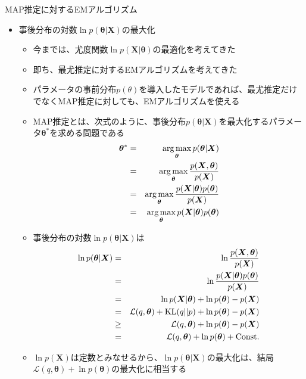 \documentclass[dvipdfmx,notheorems,t]{beamer}
\begin{document}
\begin{frame}{MAP推定に対するEMアルゴリズム}

\begin{itemize}
	\item 事後分布の対数$\ln p(\bm{\theta} | \bm{X})$の最大化
	\begin{itemize}
		\item 今までは、尤度関数$\ln p(\bm{X} | \bm{\theta})$の最適化を考えてきた
		\item 即ち、\alert{最尤推定に対するEMアルゴリズム}を考えてきた
		\newline
		\item パラメータの事前分布$p(\theta)$を導入したモデルであれば、最尤推定だけでなく\alert{MAP推定}に対しても、EMアルゴリズムを使える
		\newline
		\item MAP推定とは、次式のように、事後分布$p(\bm{\theta} | \bm{X})$を最大化するパラメータ$\bm{\theta}^*$を求める問題である
		\begin{eqnarray}
			\bm{\theta}^* &=& \operatorname*{arg\,max}_{\bm{\theta}} p(\bm{\theta} | \bm{X}) \\
			&=& \operatorname*{arg\,max}_{\bm{\theta}} \frac{p(\bm{X}, \bm{\theta})}{p(\bm{X})} \\
			&=& \operatorname*{arg\,max}_{\bm{\theta}} \frac{p(\bm{X} | \bm{\theta}) p(\bm{\theta})}{p(\bm{X})} \\
			&=& \operatorname*{arg\,max}_{\bm{\theta}} p(\bm{X} | \bm{\theta}) p(\bm{\theta})
		\end{eqnarray}
		
		\item 事後分布の対数$\ln p(\bm{\theta} | \bm{X})$は
		\begin{eqnarray}
			\ln p(\bm{\theta} | \bm{X}) &=& \ln \frac{p(\bm{X}, \bm{\theta})}{p(\bm{X})} \\
			&=& \ln \frac{p(\bm{X} | \bm{\theta}) p(\bm{\theta})}{p(\bm{X})} \nonumber \\
			&=& \ln p(\bm{X} | \bm{\theta}) + \ln p(\bm{\theta}) - p(\bm{X}) \\
			&=& \mathcal{L}(q, \bm{\theta}) + \operatorname{KL} (q || p) + \ln p(\bm{\theta}) - p(\bm{X}) \\
			&\ge& \mathcal{L}(q, \bm{\theta}) + \ln p(\bm{\theta}) - p(\bm{X}) \\
			&=& \mathcal{L}(q, \bm{\theta}) + \ln p(\bm{\theta}) + \mathrm{Const.}
		\end{eqnarray}
		
		\item $\ln p(\bm{X})$は定数とみなせるから、$\ln p(\bm{\theta} | \bm{X})$の最大化は、結局\color{red}$\mathcal{L}(q, \bm{\theta}) + \ln p(\bm{\theta})$の最大化に相当\normalcolor する
	\end{itemize} \
	

\end{itemize}
\end{frame}
\end{document}

